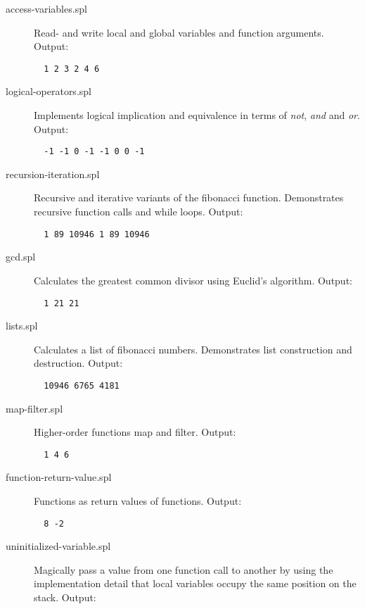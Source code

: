 \documentclass[a4paper]{article}
\begin{document}
\begin{description}

  \item[access-variables.spl] Read- and write local and global variables and
  function arguments. Output:

  \begin{verbatim}
  1 2 3 2 4 6
  \end{verbatim}

  \item[logical-operators.spl] Implements logical implication and equivalence in
  terms of \emph{not}, \emph{and} and \emph{or}. Output:

  \begin{verbatim}
  -1 -1 0 -1 -1 0 0 -1
  \end{verbatim}

  \item[recursion-iteration.spl] Recursive and iterative variants of the
  fibonacci function. Demonstrates recursive function calls and while loops.
  Output:

  \begin{verbatim}
  1 89 10946 1 89 10946
  \end{verbatim}

  \item[gcd.spl] Calculates the greatest common divisor using Euclid's
  algorithm. Output:

  \begin{verbatim}
  1 21 21
  \end{verbatim}

  \item[lists.spl] Calculates a list of fibonacci numbers.  Demonstrates list
  construction and destruction. Output:

  \begin{verbatim}
  10946 6765 4181
  \end{verbatim}

  \item[map-filter.spl] Higher-order functions map and filter. Output:
  \begin{verbatim}
  1 4 6
  \end{verbatim}

  \item[function-return-value.spl] Functions as return values of functions.
  Output:
  \begin{verbatim}
  8 -2
  \end{verbatim}

  \item[uninitialized-variable.spl] Magically pass a value from one function
  call to another by using the implementation detail that local variables occupy
  the same position on the stack. Output:


\end{description}
\end{document}
